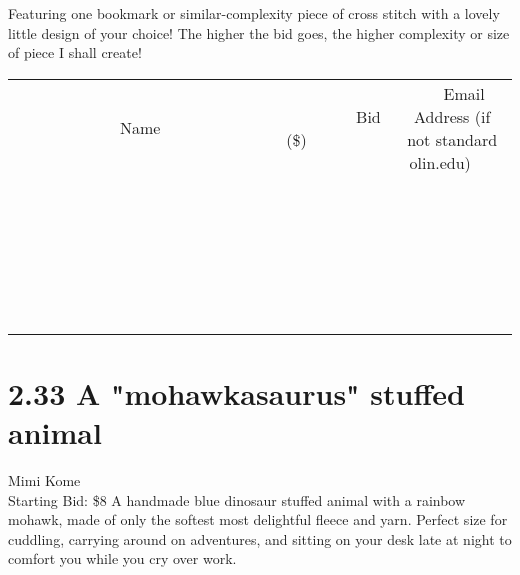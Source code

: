 \documentclass[11pt]{article}
\begin{document}
Featuring one bookmark or similar-complexity piece of cross stitch with a lovely little design of your choice! The higher the bid goes, the higher complexity or size of piece I shall create!
\\[6ex]
\begin{tabular}{c c c}
~~~~~~~~~~~~~Name~~~~~~~~~~~~~ & ~~~~~~~~~Bid (\$)~~~~~~~~~  & ~~~Email Address (if not standard olin.edu)~~~\\
 & & \\
\hline
 & & \\
\hline
 & & \\
\hline
 & & \\
\hline
 & & \\
\hline
 & & \\
\hline
 & & \\
\hline
 & & \\
\hline
 & & \\
\hline
 & & \\
\hline
 & & \\
\hline
 & & \\
\hline
 & & \\
\hline
 & & \\
\hline
 & & \\
\hline
 & & \\
\hline
 & & \\
\hline
 & & \\
\hline
 & & \\
\hline
 & & \\
\hline
 & & \\
\hline
 & & \\
\hline
 & & \\
\hline
 & & \\
\hline
 & & \\
\hline
 & & \\
\hline
\end{tabular}
\newpage
\section*{2.33 A "mohawkasaurus" stuffed animal}
Mimi Kome
\\
Starting Bid: \$8
\newline
A handmade blue dinosaur stuffed animal with a rainbow mohawk, made of only the softest most delightful fleece and yarn. Perfect size for cuddling, carrying around on adventures, and sitting on your desk late at night to comfort you while you cry over work. 
\end{document}
